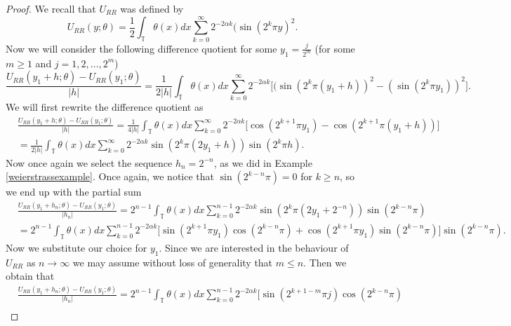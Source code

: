 \documentclass[12pt,a4paper]{article}
\theoremstyle{definition}
\theoremstyle{remark}
\numberwithin{equation}{section}
\begin{document}
\begin{appendices}
\begin{proof}
We recall that $U_{RR}$ was defined by
\begin{equation}
U_{RR}(y;\theta)= \frac{1}{2} \int_{\mathbb{T}} \theta (x) dx \sum_{k=0 }^\infty 2^{-2\alpha k} (\sin(2^{k } \pi y)^2.
\end{equation}
Now we will consider the following difference quotient for some $y_1 = \frac{j}{2^m}$ (for some $m \geq 1$ and $j= 1, 2, \ldots, 2^m$)
\begin{equation*}
\frac{U_{RR} (y_1 + h; \theta) - U_{RR} (y_1 ; \theta)}{\lvert h \rvert} = \frac{1}{2 \lvert h \rvert} \int_{\mathbb{T}} \theta (x) dx \sum_{k=0 }^\infty 2^{-2\alpha k} \bigg[ (\sin(2^{k } \pi (y_1+h))^2 - (\sin(2^{k } \pi y_1))^2 \bigg].
\end{equation*}
We will first rewrite the difference quotient as
\begin{align*}
&\frac{U_{RR} (y_1 + h; \theta) - U_{RR} (y_1 ; \theta)}{\lvert h \rvert} = \frac{1}{4 \lvert h \rvert} \int_{\mathbb{T}} \theta (x) dx \sum_{k=0 }^\infty 2^{-2\alpha k} \bigg[ \cos (2^{k +1} \pi y_1) - \cos(2^{k +1} \pi (y_1 + h)) \bigg] \\
&= \frac{1}{2 \lvert h \rvert} \int_{\mathbb{T}} \theta (x) dx \sum_{k=0 }^\infty 2^{-2\alpha k} \sin ( 2^k \pi (2 y_1 + h) ) \sin (2^k \pi h).
\end{align*}
Now once again we select the sequence $h_n = 2^{-n}$, as we did in Example \ref{weierstrassexample}. Once again, we notice that $\sin (2^{k-n} \pi ) = 0$ for $k \geq n$, so we end up with the partial sum
\begin{align*}
&\frac{U_{RR} (y_1 + h_n; \theta) - U_{RR} (y_1 ; \theta)}{\lvert h_n \rvert} = 2^{n-1} \int_{\mathbb{T}} \theta (x) dx \sum_{k=0 }^{n-1} 2^{-2\alpha k} \sin ( 2^k \pi (2 y_1 + 2^{-n}) ) \sin (2^{k-n} \pi ) \\
&= 2^{n-1} \int_{\mathbb{T}} \theta (x) dx \sum_{k=0 }^{n-1} 2^{-2\alpha k} \bigg[ \sin ( 2^{k+1} \pi y_1) \cos (2^{k-n} \pi ) + \cos ( 2^{k+1} \pi y_1) \sin (2^{k-n} \pi ) \bigg] \sin (2^{k-n} \pi ).
\end{align*}
Now we substitute our choice for $y_1$. Since we are interested in the behaviour of $U_{RR}$ as $n \rightarrow \infty$ we may assume without loss of generality that $m \leq n$. Then we obtain that
\begingroup
\allowdisplaybreaks
\begin{align}
&\frac{U_{RR} (y_1 + h_n; \theta) - U_{RR} (y_1 ; \theta)}{\lvert h_n \rvert} = 2^{n-1} \int_{\mathbb{T}} \theta (x) dx \sum_{k=0 }^{n-1} 2^{-2\alpha k} \bigg[ \sin ( 2^{k+1-m} \pi j) \cos (2^{k-n} \pi ) \nonumber \\

\end{align}
\end{proof}
\end{appendices}
\end{document}
